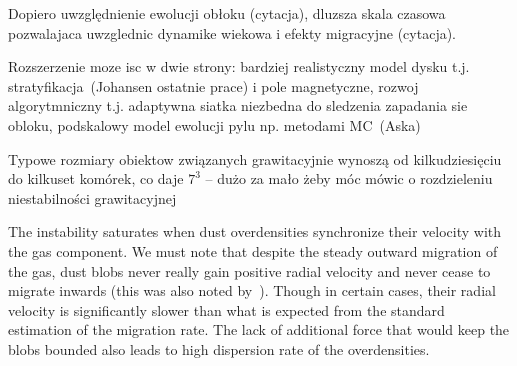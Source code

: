 Dopiero uwzględnienie ewolucji obłoku (cytacja), dluzsza skala czasowa
pozwalajaca uwzglednic dynamike wiekowa i efekty migracyjne (cytacja).

Rozszerzenie moze isc w dwie strony: bardziej realistyczny model dysku t.j.
stratyfikacja~(Johansen ostatnie prace) i pole magnetyczne, rozwoj
algorytmniczny t.j. adaptywna siatka niezbedna do sledzenia zapadania sie
obloku, podskalowy model ewolucji pylu np.  metodami MC~(Aska)

Typowe rozmiary obiektow związanych grawitacyjnie wynoszą od kilkudziesięciu do
kilkuset komórek, co daje $7^3$ -- dużo za mało żeby móc mówic o rozdzieleniu
niestabilności grawitacyjnej

\par The instability saturates when dust overdensities synchronize their
velocity with the gas component. We must note that despite the steady outward
migration of the gas, dust blobs never really gain positive radial velocity and
never cease to migrate inwards (this was also noted by~\cite{JY07}). Though in
certain cases, their radial velocity is significantly slower than what is
expected from the standard estimation of the migration rate. The lack of
additional force that would keep the blobs bounded also leads to high dispersion
rate of the overdensities.

